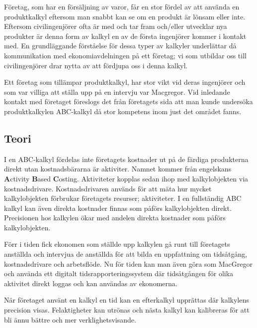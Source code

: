 Företag, som har en försäljning av varor, får en stor fördel av att använda en produktkalkyl eftersom man snabbt kan se om en produkt är lönsam eller inte.
Eftersom civilingenjörer ofta är med och tar fram och/eller utvecklar nya produkter är denna form av kalkyl en av de första ingenjörer kommer i kontakt med.
En grundläggande förståelse för dessa typer av kalkyler underlättar då kommunikation med ekonomiavdelningen på ett företag; vi som utbildar oss till civilingenjörer drar nytta av att fördjupa oss i denna kalkyl. 

Ett företag som tillämpar produktkalkyl, har stor vikt vid deras ingenjörer och som var villiga att ställa upp på en intervju var Macgregor. 
Vid inledande kontakt med företaget föreslogs det från företagets sida att man kunde undersöka produktkalkylen ABC-kalkyl då stor kompetens inom just det området fanns.


\subsection{Teori} %


I en ABC-kalkyl fördelas inte företagets kostnader ut på de färdiga produkterna direkt utan kostnadsbärarna är aktiviter.
Namnet kommer från engelskans {\bf A}ctivity {\bf B}ased {\bf C}osting.
Aktiviteter kopplas sedan ihop med kalkylobjekten via kostnadsdrivare.
Kostnadsdrivaren används för att mäta hur mycket kalkylobjekten förbrukar företagets resurser; aktiviteter.
I en fullständig ABC kalkyl kan även direkta kostnader finnas som påförs kalkylobjekten direkt.
Precisionen hos kalkylen ökar med andelen direkta kostnader som påförs kalkylobjekten.\cite{dne}

Förr i tiden fick ekonomen som ställde upp kalkylen gå runt till företagets anställda och intervjua de anställda för att bilda en uppfattning om tidsåtgång, kostnadsdrivare och arbetsflöde. Nu för tiden kan man även göra som MacGregor och använda ett digitalt tidsrapporteringssystem där tidsåtgången för olika aktivitet direkt loggas och kan användas av ekonomerna.\cite{daniel}

När företaget använt en kalkyl en tid kan en efterkalkyl upprättas där kalkylens precision visas. Felaktigheter kan utrönas och nästa kalkyl kan kalibreras för att bli ännu bättre och mer verklighetsvisande.




